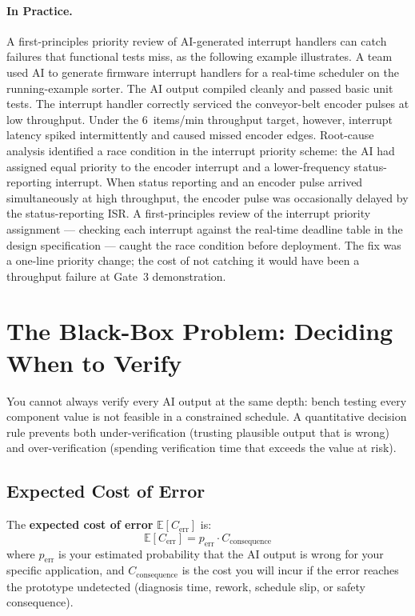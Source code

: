 \paragraph{In Practice.}
A first-principles priority review of AI-generated interrupt handlers can catch
failures that functional tests miss, as the following example illustrates.
A team used AI to generate firmware interrupt handlers for a real-time
scheduler on the running-example sorter.
The AI output compiled cleanly and passed basic unit tests.
The interrupt handler correctly serviced the conveyor-belt encoder pulses at
low throughput.
Under the 6~items/min throughput target, however, interrupt latency spiked
intermittently and caused missed encoder edges.
Root-cause analysis identified a race condition in the interrupt priority
scheme: the AI had assigned equal priority to the encoder interrupt and a
lower-frequency status-reporting interrupt.
When status reporting and an encoder pulse arrived simultaneously at high
throughput, the encoder pulse was occasionally delayed by the status-reporting
ISR.
A first-principles review of the interrupt priority assignment --- checking
each interrupt against the real-time deadline table in the design specification
--- caught the race condition before deployment.
The fix was a one-line priority change; the cost of not catching it would have
been a throughput failure at Gate~3 demonstration.

\section{The Black-Box Problem: Deciding When to Verify}
\label{sec:ch8-blackbox}

You cannot always verify every AI output at the same depth: bench testing
every component value is not feasible in a constrained schedule.
A quantitative decision rule prevents both under-verification (trusting
plausible output that is wrong) and over-verification (spending verification
time that exceeds the value at risk).

\subsection{Expected Cost of Error}
\label{sec:ch8-expected-cost}

The \textbf{expected cost of error}
$\mathbb{E}[C_{\text{err}}]$ is:
%
\begin{equation}
  \label{eq:ch8-expected-cost}
  \mathbb{E}[C_{\text{err}}] = p_{\text{err}} \cdot C_{\text{consequence}}
\end{equation}
%
where $p_{\text{err}}$ is your estimated probability that the AI output is
wrong for your specific application, and $C_{\text{consequence}}$ is the
cost you will incur if the error reaches the prototype undetected (diagnosis
time, rework, schedule slip, or safety consequence).

